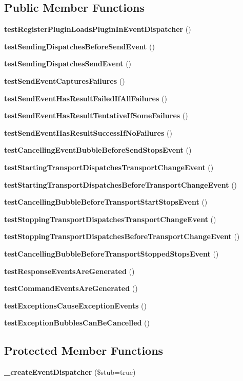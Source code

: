 \subsection*{Public Member Functions}
\begin{DoxyCompactItemize}
\item 
{\bf test\+Register\+Plugin\+Loads\+Plugin\+In\+Event\+Dispatcher} ()
\item 
{\bf test\+Sending\+Dispatches\+Before\+Send\+Event} ()
\item 
{\bf test\+Sending\+Dispatches\+Send\+Event} ()
\item 
{\bf test\+Send\+Event\+Captures\+Failures} ()
\item 
{\bf test\+Send\+Event\+Has\+Result\+Failed\+If\+All\+Failures} ()
\item 
{\bf test\+Send\+Event\+Has\+Result\+Tentative\+If\+Some\+Failures} ()
\item 
{\bf test\+Send\+Event\+Has\+Result\+Success\+If\+No\+Failures} ()
\item 
{\bf test\+Cancelling\+Event\+Bubble\+Before\+Send\+Stops\+Event} ()
\item 
{\bf test\+Starting\+Transport\+Dispatches\+Transport\+Change\+Event} ()
\item 
{\bf test\+Starting\+Transport\+Dispatches\+Before\+Transport\+Change\+Event} ()
\item 
{\bf test\+Cancelling\+Bubble\+Before\+Transport\+Start\+Stops\+Event} ()
\item 
{\bf test\+Stopping\+Transport\+Dispatches\+Transport\+Change\+Event} ()
\item 
{\bf test\+Stopping\+Transport\+Dispatches\+Before\+Transport\+Change\+Event} ()
\item 
{\bf test\+Cancelling\+Bubble\+Before\+Transport\+Stopped\+Stops\+Event} ()
\item 
{\bf test\+Response\+Events\+Are\+Generated} ()
\item 
{\bf test\+Command\+Events\+Are\+Generated} ()
\item 
{\bf test\+Exceptions\+Cause\+Exception\+Events} ()
\item 
{\bf test\+Exception\+Bubbles\+Can\+Be\+Cancelled} ()
\end{DoxyCompactItemize}
\subsection*{Protected Member Functions}
\begin{DoxyCompactItemize}
\item 
{\bf \+\_\+create\+Event\+Dispatcher} (\$stub=true)
\end{DoxyCompactItemize}
